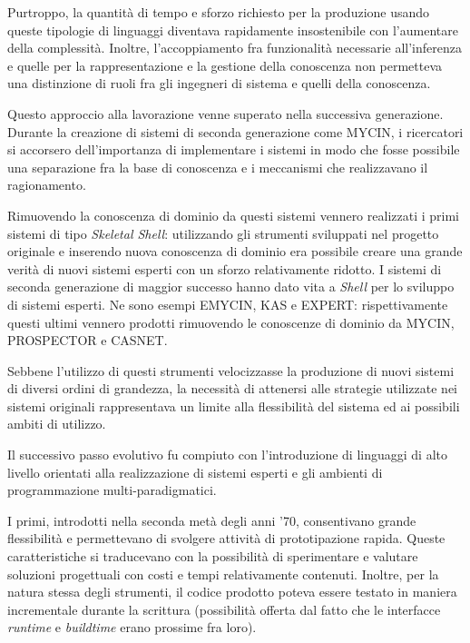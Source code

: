 Purtroppo, la quantità di tempo e sforzo richiesto per la produzione usando queste tipologie di linguaggi diventava rapidamente insostenibile con l'aumentare della complessità. Inoltre, l'accoppiamento fra funzionalità necessarie all'inferenza e quelle per la rappresentazione e la gestione della conoscenza non permetteva una distinzione di ruoli fra gli ingegneri di sistema e quelli della conoscenza.~\cite{development1993}

Questo approccio alla lavorazione venne superato nella successiva generazione. Durante la creazione di sistemi di seconda generazione come MYCIN, i ricercatori si accorsero dell'importanza di implementare i sistemi in modo che fosse possibile una separazione fra la base di conoscenza e i meccanismi che realizzavano il ragionamento.

Rimuovendo la conoscenza di dominio da questi sistemi vennero realizzati i primi sistemi di tipo \emph{Skeletal Shell}: utilizzando gli strumenti sviluppati nel progetto originale e inserendo nuova conoscenza di dominio era possibile creare una grande verità di nuovi sistemi esperti con un sforzo relativamente ridotto. I sistemi di seconda generazione di maggior successo hanno dato vita a \emph{Shell} per lo sviluppo di sistemi esperti. Ne sono esempi EMYCIN, KAS e EXPERT: rispettivamente questi ultimi vennero prodotti rimuovendo le conoscenze di dominio da MYCIN, PROSPECTOR e CASNET.

Sebbene l'utilizzo di questi strumenti velocizzasse la produzione di nuovi sistemi di diversi ordini di grandezza, la necessità di attenersi alle strategie utilizzate nei sistemi originali rappresentava un limite alla flessibilità del sistema ed ai possibili ambiti di utilizzo. 

Il successivo passo evolutivo fu compiuto con l'introduzione di linguaggi di alto livello orientati alla realizzazione di sistemi esperti e gli ambienti di programmazione multi-paradigmatici.

I primi, introdotti nella seconda metà degli anni '70, consentivano grande flessibilità e permettevano di svolgere attività di prototipazione rapida. Queste caratteristiche si traducevano con la possibilità di sperimentare  e valutare soluzioni progettuali con costi e tempi relativamente contenuti. Inoltre, per la natura stessa degli strumenti, il codice prodotto poteva essere testato in maniera incrementale durante la scrittura (possibilità offerta dal fatto che le interfacce \emph{runtime} e \emph{buildtime} erano prossime fra loro).~\cite{jackson1999}

